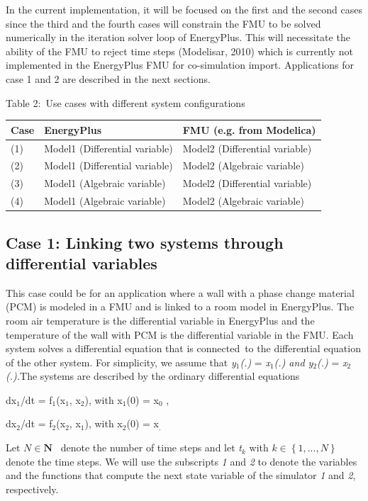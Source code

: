In the current implementation, it will be focused on the first and the second cases since the third and the fourth cases will constrain the FMU to be solved numerically in the iteration solver loop of EnergyPlus. This will necessitate the ability of the FMU to reject time steps (Modelisar, 2010) which is currently not implemented in the EnergyPlus FMU for co-simulation import. Applications for case 1 and 2 are described in the next sections.

Table 2:~Use cases with different system configurations

\begin{longtable}[c]{@{}lll@{}}
\toprule 
Case & EnergyPlus & FMU (e.g. from Modelica) \tabularnewline \midrule
\endhead
(1) & Model1 (Differential variable) & Model2 (Differential variable) \tabularnewline
(2) & Model1 (Differential variable) & Model2 (Algebraic variable) \tabularnewline
(3) & Model1 (Algebraic variable) & Model2 (Differential variable) \tabularnewline
(4) & Model1 (Algebraic variable) & Model2 (Algebraic variable) \tabularnewline
\bottomrule
\end{longtable}

\subsection{Case 1: Linking two systems through differential variables}\label{case-1-linking-two-systems-through-differential-variables}

This case could be for an application where a wall with a phase change material (PCM) is modeled in a FMU and is linked to a room model in EnergyPlus. The room air temperature is the differential variable in EnergyPlus and the temperature of the wall with PCM is the differential variable in the FMU. Each system solves a differential equation that is connected~to the differential equation of the other system. For simplicity, we assume that \emph{y\(_{1}\)(.)} = \emph{x\(_{1}\)(.) and y\(_{2}\)(.)} = \emph{x\(_{2}\)(.).}The systems are described by the ordinary differential equations

dx\(_{1}\)/dt = f\(_{1}\)(x\(_{1}\), x\(_{2}\)), with x\(_{1}\)(0) = x\(_{0}\) ,

dx\(_{2}\)/dt = f\(_{2}\)(x\(_{2}\), x\(_{1}\)), with x\(_{2}\)(0) = x\(_{.}\)

Let \(N\in\textbf{N}\) ~denote the number of time steps and let \emph{t\(_{k}\)} with \(k\in\left\{1,...,N\right\}\) denote the time steps. We will use the subscripts \emph{1} and \emph{2} to denote the variables and the functions that compute the next state variable of the simulator \emph{1} and \emph{2}, respectively.

